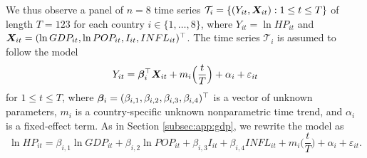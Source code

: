 \documentclass[a4paper,12pt]{article}
\makeatletter
\renewcommand{\eqref}[1]{\tagform@{\ref{#1}}}
\makeatother
\begin{document}
We thus observe a panel of $n = 8$ time series $\mathcal{T}_i = \{(Y_{it}, \boldsymbol{X}_{it}): 1 \le t \le T \}$ of length \linebreak$T = 123$ for each country $i \in \{1,\ldots, 8\}$, where $Y_{it} = \ln HP_{it}$ and $\X_{it} = (\ln GDP_{it}, \linebreak \ln POP_{it}, I_{it}, INFL_{it})^\top$. The time series $\mathcal{T}_i$ is assumed to follow the model 
\begin{equation}\label{eq:model:app3}
Y_{it} = \bm{\beta}^\top_i \boldsymbol{X}_{it} + m_i \Big( \frac{t}{T} \Big) + \alpha_i + \varepsilon_{it} 
\end{equation}
for $1 \le t \le T$, where $\bm{\beta}_i = (\beta_{i, 1}, \beta_{i, 2}, \beta_{i, 3}, \beta_{i, 4})^\top$ is a vector of unknown parameters, $m_i$ is a country-specific unknown nonparametric time trend, and $\alpha_i$ is a fixed-effect term. As in Section \ref{subsec:app:gdp}, we rewrite the model \eqref{eq:model:app3} as
\begin{equation}\label{eq:model:app4}
\ln HP_{it} = \beta_{i, 1} \ln GDP_{it} + \beta_{i, 2} \ln POP_{it} + \beta_{i, 3} I_{it} + \beta_{i, 4} INFL_{it} + m_i \Big( \frac{t}{T} \Big) + \alpha_i + \varepsilon_{it}.
\end{equation}
\end{document}
